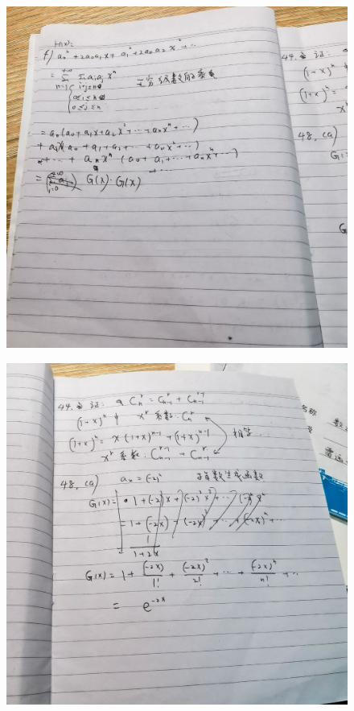 \documentclass{article}
\begin{document}
   
    \begin{figure}[H]
    \centering
    \includegraphics[width=1\textwidth]{IMG_20221205_183649.jpg}
    \caption{\label{Lab9}}
    \end{figure}

    
    \begin{figure}[H]
    \centering
    \includegraphics[width=1\textwidth]{IMG_20221205_183652.jpg}
    \caption{\label{Lab9}}
    \end{figure}
\end{document}
